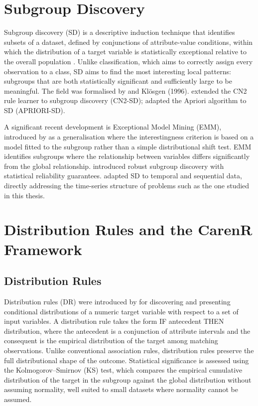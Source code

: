 \section{Subgroup Discovery}\label{sec:subgroup_discovery}

Subgroup discovery (SD) is a descriptive induction technique that identifies subsets of a dataset, defined by conjunctions of attribute-value conditions, within which the distribution of a target variable is statistically exceptional relative to the overall population \citep{Herrera2011}. Unlike classification, which aims to correctly assign every observation to a class, SD aims to find the most interesting local patterns: subgroups that are both statistically significant and sufficiently large to be meaningful. The field was formalised by \citet{Wrobel1997} and Klösgen (1996). \citet{Lavrac2004} extended the CN2 rule learner \citep{Clark1989} to subgroup discovery (CN2-SD); \citet{Kav2006} adapted the Apriori algorithm to SD (APRIORI-SD).

A significant recent development is Exceptional Model Mining (EMM), introduced by \citet{Duivesteijn2016} as a generalisation where the interestingness criterion is based on a model fitted to the subgroup rather than a simple distributional shift test. EMM identifies subgroups where the relationship between variables differs significantly from the global relationship. \citet{Lemmerich2022} introduced robust subgroup discovery with statistical reliability guarantees. \citet{Zimmermann2019} adapted SD to temporal and sequential data, directly addressing the time-series structure of problems such as the one studied in this thesis.


\section{Distribution Rules and the CarenR Framework}\label{sec:distribution_rules_and_the}


\subsection{Distribution Rules}\label{sub:distribution_rules}

Distribution rules (DR) were introduced by \citet{Jorge2006} for discovering and presenting conditional distributions of a numeric target variable with respect to a set of input variables. A distribution rule takes the form IF antecedent THEN distribution, where the antecedent is a conjunction of attribute intervals and the consequent is the empirical distribution of the target among matching observations. Unlike conventional association rules, distribution rules preserve the full distributional shape of the outcome. Statistical significance is assessed using the Kolmogorov--Smirnov (KS) test, which compares the empirical cumulative distribution of the target in the subgroup against the global distribution without assuming normality, well suited to small datasets where normality cannot be assumed.


